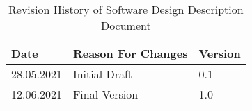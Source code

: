 \begin{table}[H]
    \centering
    \begin{tabular}{|l|l|l|}
    	\hline
         Date & Reason For Changes & Version \\
         \hline
         28.05.2021 & Initial Draft & 0.1 \\
         12.06.2021 & Final Version & 1.0 \\
        \hline
    \end{tabular}
    \caption{Revision History of Software Design Description Document}
    \label{tab:sdd_rh}
\end{table}